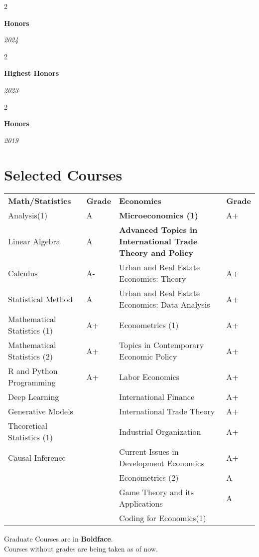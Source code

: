 \documentclass[10pt, letterpaper]{article}
\newenvironment{twocolentry}[2][]{
	\onecolentry
	\def\secondColumn{#2}
	\setcolumnwidth{\fill, 4.5 cm}
	\begin{paracol}{2}
	}{
		\switchcolumn \raggedleft \secondColumn
	\end{paracol}
	\endonecolentry
} %
\begin{document}
	
	


\begin{twocolentry}{
		\textit{2024}    }
	\textbf{Honors}
\end{twocolentry}

\begin{twocolentry}{
		\textit{2023}    }
	\textbf{Highest Honors}
\end{twocolentry}
	
\begin{twocolentry}{
		\textit{2019}    }
	\textbf{Honors}
\end{twocolentry}

\vspace{12pt}


\section{Selected Courses}
\setlength{\tabcolsep}{3pt}
\begin{tabularx}{\textwidth}{|>{\centering\arraybackslash}X|>{\centering\arraybackslash}p{1cm}|>{\centering\arraybackslash}p{7
			cm}|>{\centering\arraybackslash}p{1cm}|}
	\hline
	\textbf{Math/Statistics} & \textbf{Grade} & \textbf{Economics} & \textbf{Grade} \\
	\hhline{|=|=|=|=|}
	Analysis(1) & A & \textbf{Microeconomics (1)} &A+ \\ \hline
	Linear Algebra & A& \textbf{Advanced Topics in International Trade Theory and Policy} & \\ \hline
	Calculus&A-&Urban and Real Estate Economics: Theory&A+\\ \hline
	Statistical Method&A&Urban and Real Estate Economics: Data Analysis&A+\\ \hline
	Mathematical Statistics (1)&A+&Econometrics (1)& A+\\ \hline
	Mathematical Statistics (2)& A+& Topics in Contemporary Economic Policy & A+\\ \hline
	R and Python Programming&A+&Labor Economics&A+\\ \hline
	Deep Learning&& International Finance & A+\\ \hline
	Generative Models	&&International Trade Theory&A+\\ \hline
	Theoretical Statistics (1)	&&Industrial Organization&A+\\ \hline
	Causal Inference&&Current Issues in Development Economics&A+\\ \hline
	&&Econometrics (2)&A\\ \hline
	&&Game Theory and its Applications&A\\  \hline
	&&Coding for Economics(1)&\\ 
	
	
	\hline  

\end{tabularx}
\noindent Graduate Courses are in \textbf{Boldface}.\\
\noindent Courses without grades are being taken as of now.
	
\end{document}

